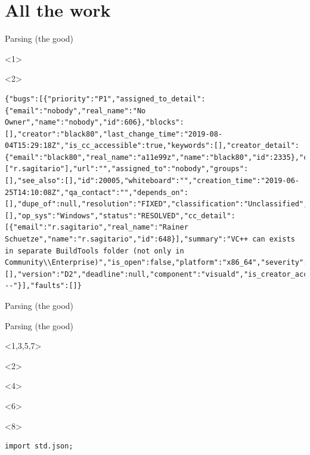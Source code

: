 \documentclass[aspectratio=169,notes]{beamer}
\begin{document}
	\section{All the work}
	\begin{frame}[fragile]{Parsing (the good)}
		
		\begin{onlyenv}<1>
			\vspace{4cm}
		\end{onlyenv}
		\begin{onlyenv}<2>
\begin{lstlisting}[basicstyle=\tiny\ttfamily,numbers=none]
{"bugs":[{"priority":"P1","assigned_to_detail":{"email":"nobody","real_name":"No Owner","name":"nobody","id":606},"blocks":[],"creator":"black80","last_change_time":"2019-08-04T15:29:18Z","is_cc_accessible":true,"keywords":[],"creator_detail":{"email":"black80","real_name":"a11e99z","name":"black80","id":2335},"cc":["r.sagitario"],"url":"","assigned_to":"nobody","groups":[],"see_also":[],"id":20005,"whiteboard":"","creation_time":"2019-06-25T14:10:08Z","qa_contact":"","depends_on":[],"dupe_of":null,"resolution":"FIXED","classification":"Unclassified","alias":[],"op_sys":"Windows","status":"RESOLVED","cc_detail":[{"email":"r.sagitario","real_name":"Rainer Schuetze","name":"r.sagitario","id":648}],"summary":"VC++ can exists in separate BuildTools folder (not only in Community\\Enterprise)","is_open":false,"platform":"x86_64","severity":"enhancement","flags":[],"version":"D2","deadline":null,"component":"visuald","is_creator_accessible":true,"product":"D","is_confirmed":true,"target_milestone":"---"}],"faults":[]}
		\end{lstlisting}
		\end{onlyenv}
	\end{frame}
	\begin{frame}[fragile]{Parsing (the good)}
			
	\end{frame}
	\begin{frame}[fragile]{Parsing (the good)}
		\begin{onlyenv}<1,3,5,7>
			
		\end{onlyenv}
		\begin{onlyenv}<2>
			
		\end{onlyenv}
		\begin{onlyenv}<4>
			
		\end{onlyenv}
		\begin{onlyenv}<6>
			
		\end{onlyenv}
		\begin{onlyenv}<8>
			\begin{lstlisting}
import std.json;
			\end{lstlisting}
		\end{onlyenv}
	\end{frame}
\end{document}

